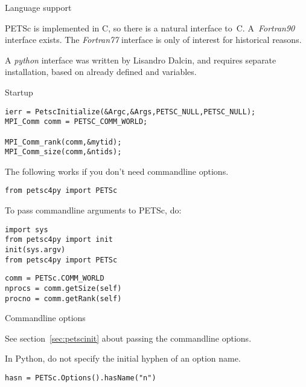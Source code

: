 
 {Language support}

PETSc is implemented in C, so there is a natural interface
to~C. A~\emph{Fortran90}
interface exists. The \emph{Fortran77}
interface is only of
interest for historical reasons.

A \emph{python}
interface was written by Lisandro Dalcin, and requires separate
installation,
based on already defined  and  variables.

 {Startup}
\label{sec:petscinit}

\begin{verbatim}
ierr = PetscInitialize(&Argc,&Args,PETSC_NULL,PETSC_NULL);
MPI_Comm comm = PETSC_COMM_WORLD;

MPI_Comm_rank(comm,&mytid);
MPI_Comm_size(comm,&ntids);
\end{verbatim}

\begin{pythonnote}
  The following works if you don't need commandline options.
\begin{verbatim}
from petsc4py import PETSc
\end{verbatim}
To pass commandline arguments to PETSc, do:
\begin{verbatim}
import sys
from petsc4py import init
init(sys.argv)
from petsc4py import PETSc
\end{verbatim}
\end{pythonnote}

\begin{verbatim}
comm = PETSc.COMM_WORLD
nprocs = comm.getSize(self) 
procno = comm.getRank(self)
\end{verbatim}

 {Commandline options}

See section~\ref{sec:petscinit} about passing the commandline options.

\begin{pythonnote}
  In Python, do not specify the initial hyphen of an option name.
\begin{verbatim}
hasn = PETSc.Options().hasName("n")
\end{verbatim}
\end{pythonnote}

